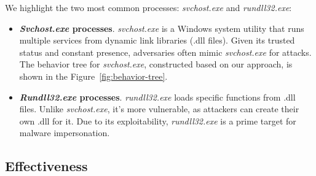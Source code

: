We highlight the two most common processes: \textit{svchost.exe} and \textit{rundll32.exe}:
\begin{itemize}
    \item \textbf{\textit{Svchost.exe} processes}. \textit{svchost.exe} is a Windows system utility that runs multiple services from dynamic link libraries (.dll files). Given its trusted status and constant presence, adversaries often mimic \textit{svchost.exe} for attacks. The behavior tree for \textit{svchost.exe}, constructed based on our approach, is shown in the Figure~\ref{fig:behavior-tree}.
    \item \textbf{\textit{Rundll32.exe} processes}. \textit{rundll32.exe} loads specific functions from .dll files. Unlike \textit{svchost.exe}, it's more vulnerable, as attackers can create their own .dll for it. Due to its exploitability, \textit{rundll32.exe} is a prime target for malware impersonation. 
\end{itemize}



\subsection{Effectiveness}
\label{sec-effective}

